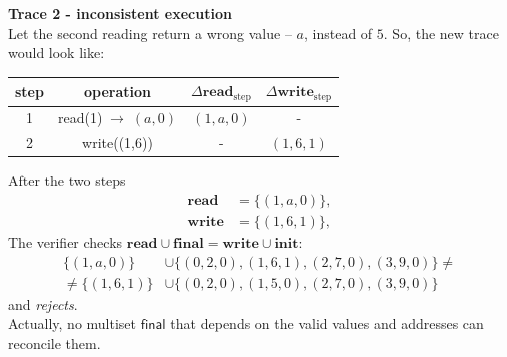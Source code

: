 \documentclass[../lecture-notes-148x210.tex]{subfiles}
\begin{document}
\begin{example}
\medskip
\noindent\textbf{Trace 2 - inconsistent execution}\\
Let the second reading return a wrong value -- $a$, instead of $5$. So, the new trace would look like:
\begin{center}
    \begin{tabular}{c|c|c|c}
    \textbf{step} & \textbf{operation} & $\Delta\mathbf{read}_{\text{step}}$ & $\Delta\mathbf{write}_{\text{step}}$\\\hline
    1 & read(1)$  \; \to \; (a, 0)$ & $(1,a,0)$ & -        \\
    2 & write((1,6))                & -         & $(1,6,1)$\\
    \end{tabular}
\end{center}
After the two steps
\begin{equation*}
    \begin{aligned}
        \mathbf{read} &= \{(1,a,0)\},\\
        \mathbf{write} &= \{(1,6,1)\},
    \end{aligned}
\end{equation*}
The verifier checks $\mathbf{read} \cup \mathbf{final} = \mathbf{write} \cup \mathbf{init}$:
\begin{align*}
    \{(1,a,0)\} &\cup \{(0,2,0), (1,6,1), (2,7,0), (3,9,0)\} \neq \\
    \neq \{(1,6,1)\} &\cup \{(0,2,0), (1,5,0), (2,7,0), (3,9,0)\}
\end{align*}
and \emph{rejects}.\\

Actually, no multiset $\mathsf{final}$ that depends on the valid values and addresses can 
reconcile them.
\end{example}
\end{document}
